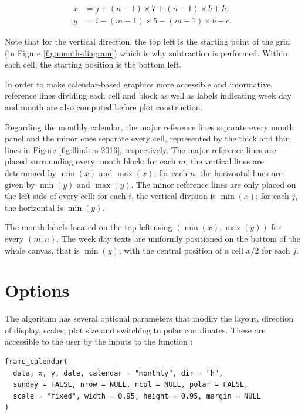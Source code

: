 \begin{equation}
  \begin{aligned}
  x &= j + (n - 1) \times 7 + (n - 1) \times b + h, \\
  y &= i - (m - 1) \times 5 - (m - 1) \times b + c. \label{eq:final}
  \end{aligned}
\end{equation}

Note that for the vertical direction, the top left is the starting point
of the grid (in Figure \ref{fig:month-diagram}) which is why subtraction
is performed. Within each cell, the starting position is the bottom
left.

In order to make calendar-based graphics more accessible and
informative, reference lines dividing each cell and block as well as
labels indicating week day and month are also computed before plot
construction.

Regarding the monthly calendar, the major reference lines separate every
month panel and the minor ones separate every cell, represented by the
thick and thin lines in Figure \ref{fig:flinders-2016}, respectively.
The major reference lines are placed surrounding every month block: for
each \(m\), the vertical lines are determined by \(\min{(x)}\) and
\(\max{(x)}\); for each \(n\), the horizontal lines are given by
\(\min{(y)}\) and \(\max{(y)}\). The minor reference lines are only
placed on the left side of every cell: for each \(i\), the vertical
division is \(\min{(x)}\); for each \(j\), the horizontal is
\(\min{(y)}\).

The month labels located on the top left using
\((\min{(x)}, \max{(y)})\) for every \((m, n)\). The week day texts are
uniformly positioned on the bottom of the whole canvas, that is
\(\min{(y)}\), with the central position of a cell \(x / 2\) for each
\(j\).

\hypertarget{options}{%
\section{Options}\label{options}}

\label{sec:opt}

The algorithm has several optional parameters that modify the layout,
direction of display, scales, plot size and switching to polar
coordinates. These are accessible to the user by the inputs to the
function :

\begin{verbatim}
frame_calendar(
  data, x, y, date, calendar = "monthly", dir = "h", 
  sunday = FALSE, nrow = NULL, ncol = NULL, polar = FALSE, 
  scale = "fixed", width = 0.95, height = 0.95, margin = NULL
)
\end{verbatim}

